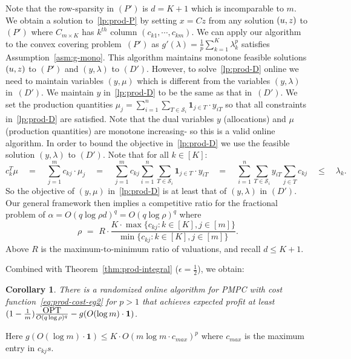 \documentclass[letterpaper,11pt]{article}
\newtheorem{cor}[thm]{Corollary}
\def \OPT  {\mbox{\rm OPT}}
\def\cS{\mathcal{S}}
\begin{document}
Note that the row-sparsity in $(P')$ is $d=K+1$ which is incomparable to $m$.  We obtain a solution to~\eqref{lp:prod-P} by setting $x=Cz$ from any solution $(u,z)$ to $(P')$ where $C_{m\times K}$ has $k^{th}$ column $(c_{k1},\cdots,c_{km})$. We can apply our algorithm to the convex covering problem~$(P')$ as $g'(\lambda)=\frac1p \sum_{k=1}^K \lambda_k^p$ satisfies Assumption~\ref{asm:g-mono}. This algorithm maintains monotone feasible solutions $(u,z)$ to $(P')$ and $(y,\lambda)$ to $(D')$. However, to solve~\eqref{lp:prod-D} online we need to maintain variables $(y,\mu)$ which is different from the variables $(y,\lambda)$ in~$(D')$. We maintain $y$ in~\eqref{lp:prod-D} to be the same as that in~$(D')$. We set the production quantities $\mu_j=\sum_{i=1}^n \sum_{T\in \cS_i} \mathbf{1}_{j\in T}\cdot y_{iT}$ so that all constraints in~\eqref{lp:prod-D} are satisfied. Note that the dual variables $y$ (allocations) and $\mu$ (production quantities) are monotone increasing- so this is a valid online algorithm.  In order to bound the objective in~\eqref{lp:prod-D} we use the feasible solution $(y,\lambda)$ to $(D')$. Note that for all $k\in [K]$:
$$c_k^T \mu \quad = \quad \sum_{j=1}^m c_{kj} \cdot \mu_j \quad = \quad \sum_{j=1}^m c_{kj} \sum_{i=1}^n \sum_{T\in \cS_i} \mathbf{1}_{j\in T}\cdot y_{iT} \quad = \quad \sum_{i=1}^n \sum_{T\in \cS_i} y_{iT} \sum_{j\in T} c_{kj} \quad \le \quad \lambda_k.$$
So the objective of $(y,\mu)$ in~\eqref{lp:prod-D} is at least that of $(y,\lambda)$ in $(D')$. Our general framework then implies a competitive ratio for the fractional problem of $\alpha=O(q\log\rho d)^q = O(q\log\rho)^q$ where
$$\rho \,\, = \,\, R\cdot \frac{K\cdot \max\{c_{kj} : k\in[K],j\in[m]\} }{\min\{c_{kj}: k\in[K],j\in[m]\}}.$$
Above $R$ is the maximum-to-minimum ratio of valuations, and recall $d\le K+1$.

Combined with Theorem~\ref{thm:prod-integral} ($\epsilon=\frac12$), we obtain:
\begin{cor}
There is a randomized online algorithm for PMPC with cost function~\eqref{eq:prod-cost-eg2} for $p>1$ that achieves expected profit at least $(1-\frac1m) \frac{\OPT}{O(q\log \rho)^q} - g(O(\log m)\cdot \mathbf{1})$.
\end{cor}
Here $g(O(\log m)\cdot \mathbf{1})\le K\cdot O\left(m\log m\cdot c_{max}\right)^p$ where $c_{max}$ is the maximum entry in $c_{kj}s$.


{\small }
\end{document}
